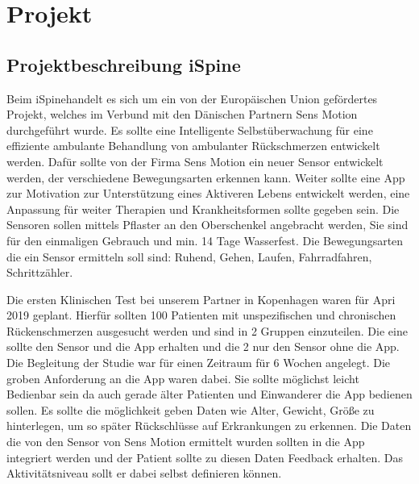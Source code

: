 \chapter{Projekt}
\section{Projektbeschreibung iSpine}\label{beschreibung}
Beim \glqq iSpine\grqq handelt es sich um ein von der Europäischen Union gefördertes Projekt, welches im Verbund mit den Dänischen Partnern Sens Motion durchgeführt wurde. Es sollte eine Intelligente Selbstüberwachung für eine effiziente ambulante Behandlung von ambulanter Rückschmerzen entwickelt werden. Dafür sollte von der Firma Sens Motion ein neuer Sensor entwickelt werden, der verschiedene Bewegungsarten erkennen kann. Weiter sollte eine App zur Motivation zur Unterstützung eines Aktiveren Lebens entwickelt werden, eine Anpassung für weiter Therapien und Krankheitsformen sollte gegeben sein. Die Sensoren sollen mittels Pflaster an den Oberschenkel angebracht werden, Sie sind für den einmaligen Gebrauch und min. 14 Tage Wasserfest. Die Bewegungsarten die ein Sensor ermitteln soll sind: Ruhend, Gehen, Laufen, Fahrradfahren, Schrittzähler.

Die ersten Klinischen Test bei unserem Partner in Kopenhagen waren für Apri 2019 geplant. Hierfür sollten 100 Patienten mit unspezifischen und chronischen Rückenschmerzen ausgesucht werden und sind in 2 Gruppen einzuteilen. Die eine sollte den Sensor und die App erhalten und die 2 nur den Sensor ohne die App. Die Begleitung der Studie war für einen Zeitraum für 6 Wochen angelegt. Die groben Anforderung an die App waren dabei. Sie sollte möglichst leicht Bedienbar sein da auch gerade älter Patienten und Einwanderer die App bedienen sollen. Es sollte die möglichkeit geben Daten wie Alter, Gewicht, Größe zu hinterlegen, um so später Rückschlüsse auf Erkrankungen zu erkennen. Die Daten die von den Sensor von Sens Motion ermittelt wurden sollten in die App integriert werden und der Patient sollte zu diesen Daten Feedback erhalten. Das Aktivitätsniveau sollt er dabei selbst definieren können.


